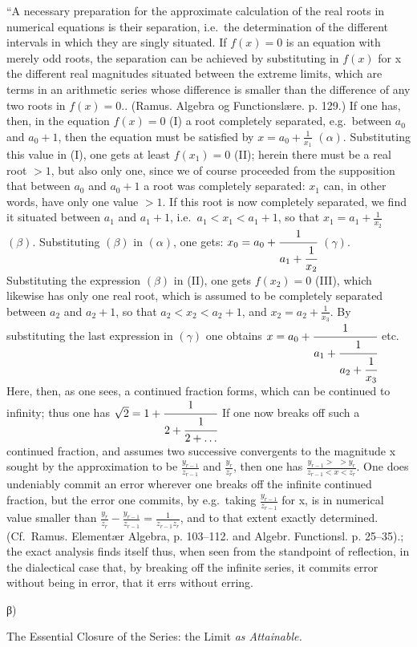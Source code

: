 \documentclass[12pt,a4paper,openany]{book}
\newcommand{\opage}[1]{\marginnote{\footnotesize\textit{[#1]}}}
\begin{document}
{``A necessary preparation for the approximate calculation of the real roots in numerical equations is their separation, i.e.\ the determination of the different intervals in which they are singly situated. If $f(x)=0$ is an equation with merely odd roots, the separation can be achieved by substituting in $f(x)$ for x the different real magnitudes situated between the extreme limits, which are terms in an arithmetic series whose difference is smaller than the difference of any two roots in $f(x)=0$.. (Ramus. Algebra og Functionslære. p. 129.) If one has, then, in the equation $f(x)=0$ (I) a root completely separated, e.g.\ between $a_{0}$ and $a_{0}+1$, then the equation must be satisfied by $x=a_{0}+\frac{1}{x_{1}}$ $(\alpha)$. Substituting this value in (I), one gets at least $f(x_{1})=0$ (II); herein there must be a real root $>1$, but also only one, since we of course proceeded from the supposition that between $a_{0}$ and $a_{0}+1$ a root was completely separated: $x_{1}$ can, in other words, have only one value $>1$. If this root is now completely separated, we find it situated between $a_{1}$ and $a_{1}+1$, i.e.\ $a_{1}<x_{1}<a_{1}+1$, so that $x_{1}=a_{1}+\frac{1}{x_{2}}$ $(\beta)$. Substituting $(\beta)$ in $(\alpha)$, one gets: $x_{0}=a_{0}+\cfrac{1}{a_{1}+\cfrac{1}{x_{2}}}$ $(\gamma)$. Substituting the expression $(\beta)$ in (II), one gets $f(x_{2})=0$ (III), which likewise has only one real root, which is assumed to be completely separated between $a_{2}$ and $a_{2}+1$, so that $a_{2}<x_{2}<a_{2}+1$, and $x_{2}=a_{2}+\frac{1}{x_{3}}$. By substituting the last expression in $(\gamma)$ one obtains $x=a_{0}+\cfrac{1}{a_{1}+\cfrac{1}{a_{2}+\cfrac{1}{x_{3}}}}$ etc. Here, then, as one sees, a continued fraction forms, which can be continued to infinity; thus one has $\sqrt{2}=1+\cfrac{1}{2+\cfrac{1}{2+\ldots}}$ If one now breaks off such a continued fraction, and assumes two successive convergents to the magnitude x sought by the approximation to be $\frac{y_{r-1}}{z_{r-1}}$ and $\frac{y_{r}}{z_{r}}$, then one has $\frac{y_{r-1}>\ \ >y_{r}}{z_{r-1}<x<z_{r}}$. One does undeniably commit an error wherever one breaks off the infinite continued fraction, but the error one commits, by e.g.\ taking $\frac{y_{r-1}}{z_{r-1}}$ for x, is in numerical value smaller than $\frac{y_{r}}{z_{r}}-\frac{y_{r-1}}{z_{r-1}}=\frac{1}{z_{r-1}z_{r}}$, and to that extent exactly determined. (Cf.\ Ramus. Elementær Algebra, p. 103--112. and Algebr. Functionsl. p. 25--35).}; the exact
\setcounter{footnote}{0}%
\opage{64}analysis finds itself thus, when seen from the standpoint of reflection, in the dialectical case that, by breaking off the infinite series, it commits error without being in error, that it errs without erring.
\setcounter{footnote}{0}%
\opage{65}
\begin{center}β)

The Essential Closure of the Series: the Limit \emph{as Attainable.}\end{center}
\end{document}
